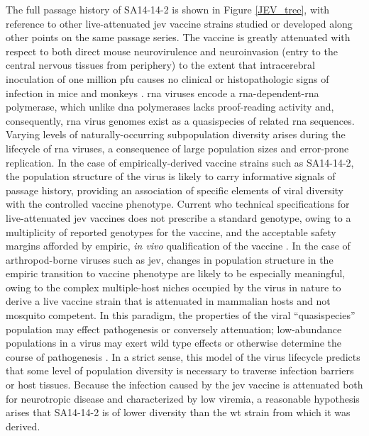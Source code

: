 The full passage history of SA14-14-2 is shown in Figure \ref{JEV_tree}, with reference to other live-attenuated \gls{jev} vaccine strains studied or developed along other points on the same passage series.  The vaccine is greatly attenuated with respect to both direct mouse neurovirulence and neuroinvasion (entry to the central nervous tissues from periphery) to the extent that intracerebral inoculation of one million \gls{pfu} causes no clinical or histopathologic signs of infection in mice and monkeys \parencite{WorldHealthOrganization:2014wca}. 
\Gls{rna} viruses encode a \gls{rna}-dependent-\gls{rna} polymerase, which unlike \gls{dna} polymerases lacks proof-reading activity and, consequently, \gls{rna} virus genomes exist as a quasispecies of related \gls{rna} sequences. Varying levels of naturally-occurring subpopulation diversity arises during the lifecycle of  \gls{rna} viruses, a consequence of large population sizes and error-prone replication. In the case of empirically-derived vaccine strains such as SA14-14-2, the population structure of the virus is likely to carry informative signals of passage history, providing an association of specific elements of viral diversity with the controlled vaccine phenotype. Current \gls{who} technical specifications for live-attenuated \gls{jev} vaccines does not prescribe a standard genotype, owing to a multiplicity of reported genotypes for the vaccine, and the acceptable safety margins afforded by empiric, \emph{in vivo} qualification of the vaccine \parencite{Ni:1995vy, Nitayaphan:1990vr, Song:2012iw, Aihara:1991tn, WorldHealthOrganization:2014wca}. In the case of arthropod-borne viruses such as \gls{jev}, changes in population structure in the empiric transition to vaccine phenotype are likely to be especially meaningful, owing to the complex multiple-host niches occupied by the virus in nature to derive a live vaccine strain that is attenuated in mammalian hosts and not mosquito competent. In this paradigm, the properties of the viral “quasispecies” population may effect pathogenesis or conversely attenuation; low-abundance populations in a virus may exert wild type effects or otherwise determine the course of pathogenesis \parencite{Vignuzzi:2006ju}. In a strict sense, this model of the virus lifecycle predicts that some level of population diversity is necessary to traverse infection barriers or host tissues. Because the infection caused by the \gls{jev} vaccine is attenuated both for neurotropic disease and characterized by low viremia, a reasonable hypothesis arises that SA14-14-2 is of lower diversity than the \gls{wt} strain from which it was derived.

